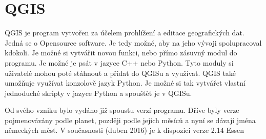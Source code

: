 \section{QGIS}
\label{QGIS}
QGIS je program vytvořen za účelem prohlížení a editace geografických dat.
Jedná se o Opensource software. Je tedy možné, aby na jeho vývoji spolupracoval
kdokoli. Je možné si vytvářit novou funkci, nebo přímo zásuvný modul do programu.
Je možné je psát v jazyce C++ nebo Python.
Tyto moduly si uživatelé mohou poté stáhnout a přidat do QGISu a využívat.
QGIS také umožňuje využívat konzolově jazyk Python. Je možné si tak vytvářet
vlastní jednoduché skripty v jazyce Python a spouštět je v QGISu.

Od svého vzniku bylo vydáno již spoustu verzí programu.
Dříve byly verze pojmenovávány podle planet, později podle jejich měsíců a nyní se dávají
jména německých měst. V současnosti (duben 2016) je k dispozici verze 2.14 Essen
